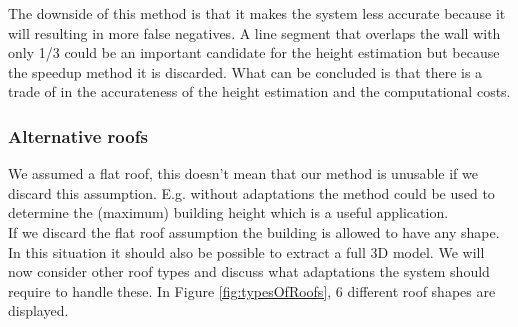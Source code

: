 The downside of this method is that it makes the system less accurate because it
will resulting in more false negatives. A line segment that overlaps the wall with only 1/3 could be an
important candidate for the height estimation but because the speedup method it is discarded.
What can be concluded is that there is a trade of in the accurateness of the
height estimation and the computational costs.


\subsubsection{Alternative roofs}

We assumed a flat roof, this doesn't mean that our method is unusable if
we discard this assumption.
E.g. without adaptations the method could be used to determine the (maximum)
building height which is a useful application.\\

If we discard the flat roof assumption the building is allowed to have any
shape. In this situation it should also be possible to extract a
full 3D model.  We will now consider other roof types and discuss what
adaptations the system should require to handle these.  In Figure
\ref{fig:typesOfRoofs}, 6 different roof shapes are displayed.\\

